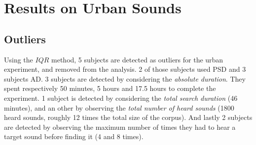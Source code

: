 \documentclass{aes2e}
\begin{document}
\section{Results on Urban Sounds} \label{resultsu}

\subsection{Outliers}


Using the $IQR$ method, 5 subjects are detected as outliers for the urban experiment, and removed from the analysis. 2 of those subjects used PSD and 3 subjects AD. %
3 subjects are detected by considering the \textit{absolute duration}. They spent respectively 50 minutes, 5 hours and 17.5 hours to complete the experiment. 1 subject is detected by considering the \textit{total search duration} (46 minutes), and an other by observing the \textit{total number of heard sounds} (1800 heard sounds, roughly 12 times the total size of the corpus). And lastly 2 subjects are detected by observing the maximum number of times they had to hear a target sound before finding it (4 and 8 times).
\end{document}
